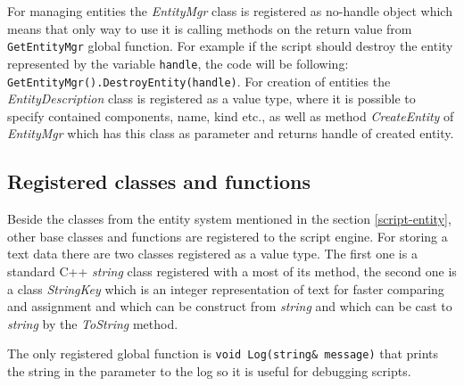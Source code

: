 For managing entities the \emph{EntityMgr} class is registered as no-handle object which means that only way to use it is calling methods on the return value from \verb/GetEntityMgr/ global function. For example if the script should destroy the entity represented by the variable \verb/handle/, the code will be following: \verb/GetEntityMgr().DestroyEntity(handle)/. For creation of entities the \emph{EntityDescription} class is registered as a value type, where it is possible to specify contained components, name, kind etc., as well as method \emph{CreateEntity} of \emph{EntityMgr} which has this class as parameter and returns handle of created entity.

\subsection{Registered classes and functions}
\label{sub:script-registered}

Beside the classes from the entity system mentioned in the section \ref{script-entity}, other base classes and functions are registered to the script engine. For storing a text data there are two classes registered as a value type. The first one is a standard C++ \emph{string} class registered with a most of its method, the second one is a class \emph{StringKey} which is an integer representation of text for faster comparing and assignment and which can be construct from \emph{string} and which can be cast to \emph{string} by the \emph{ToString} method.


The only registered global function is \verb/void Log(string& message)/ that prints the string in the parameter to the log so it is useful for debugging scripts.

